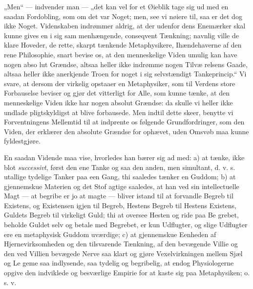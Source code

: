 \documentclass[12pt]{book}
\newcommand{\opage}[1]{\marginnote{\footnotesize\textit{[#1]}}}
\begin{document}
„Men“ --- indvender man --- „det kan vel for et
Øieblik tage sig ud med en saadan Fordobling, som om
det var Noget; men, see vi nøiere til, saa er det dog
ikke Noget. Videnskaben indrømmer aldrig, at der
udenfor dens Enemærker skal kunne gives en i sig sam\-%
menhængende, conseqvent Tænkning; navnlig ville de
klare Hoveder, de rette, skarpt tænkende Metaphysikere,
Ihændehaverne af den rene Philosophie, snart bevise os,
at den menneskelige Viden umulig kan have nogen abso\-%
lut Grændse, altsaa heller ikke indrømme nogen Tilvæ\-%
relsens Gaade, altsaa heller ikke anerkjende Troen for
noget i sig selvstændigt Tankeprincip.“ Vi svare, at
dersom der virkelig opstaaer en Metaphysiker, som til
Verdens store Forbauselse beviser og gjør det vitterligt
for Alle, som kunne tænke, at den menneskelige Viden
ikke har nogen absolut Grændse: da skulle vi heller ikke
undlade pligtskyldigst at blive forbausede. Men indtil
dette skeer, benytte vi Forventningens Mellemtid til at
indprente os følgende Grundfordringer, som den Viden,
der erklærer den absolute Grændse for ophævet, uden
Omsvøb maa kunne fyldestgjøre.

En saadan Vidende maa vise, hvorledes han bærer
sig ad med: a) at tænke, ikke blot \textit{successivt}, først den
ene Tanke og saa den anden, men simultant, d. v. s.
utallige tydelige Tanker paa een Gang, thi saaledes tænker
\opage{144}\setcounter{footnote}{0}%
en Guddom; b) at gjennemskue Materien og det Stof\-%
agtige saaledes, at han ved sin intellectuelle Magt --- at
begribe er jo at magte --- bliver istand til at forvandle
Begreb til Existens, og Existensen igjen til Begreb,
Hestens Begreb til Hestens Existens, Guldets Begreb til
virkeligt Guld; thi at oversee Hesten og ride paa Be\-%
grebet, beholde Guldet selv og betale med Begrebet, er
kun Udflugter, og slige Udflugter ere en metaphysisk
Guddom uværdige; c) at gjennemskue Eenheden af
Hjernevirksomheden og den tilsvarende Tænkning, af
den bevægende Villie og den ved Villien bevægede Nerve
saa klart og gjøre Vexelvirkningen mellem Sjæl og Le\-%
geme saa indlysende, saa tydelig og begribelig, at endog
Physiologerne opgive den indviklede og besværlige Empirie
for at kaste sig paa Metaphysiken; o. s. v.
\end{document}
